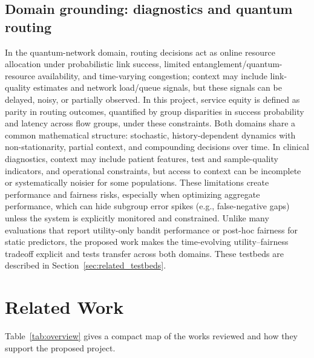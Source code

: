 \documentclass[conference]{IEEEtran}
\begin{document}
\subsection{Domain grounding: diagnostics and quantum routing}
In the quantum-network domain, routing decisions act as online resource allocation
under probabilistic link success, limited entanglement/quantum-resource availability, and
time-varying congestion;
context may include link-quality estimates and network load/queue signals, but these signals
can be delayed, noisy, or partially observed. In this project, service equity is defined as parity in
routing outcomes, quantified by group disparities in success probability and latency across flow groups, under these
constraints. Both domains share a common mathematical structure: stochastic, history-dependent
dynamics with non-stationarity, partial context, and compounding decisions over time.
In clinical diagnostics, context may include patient features, test and
sample-quality indicators, and operational constraints, but access to context can be
incomplete or systematically noisier for some populations. These limitations create
performance and fairness risks, especially when optimizing aggregate performance, which can
hide subgroup error spikes (e.g., false-negative gaps) unless the system is explicitly
monitored and constrained. Unlike many evaluations that report utility-only bandit performance
or post-hoc fairness for static predictors, the proposed work makes the time-evolving
utility--fairness tradeoff explicit and tests transfer across both domains.
These testbeds are described in Section~\ref{sec:related_testbeds}.


\section{Related Work}
Table~\ref{tab:overview} gives a compact map of the works reviewed and how they support
the proposed project.
\end{document}
